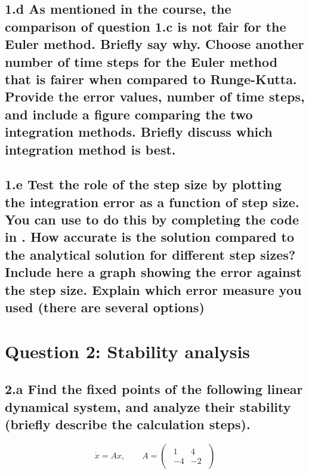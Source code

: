 \documentclass{cmc}
\begin{document}
\vspace{0.3\textheight}



\clearpage

\subsection*{1.d As mentioned in the course, the comparison of question 1.c is
  not fair for the Euler method.  Briefly say why. Choose another number of time
  steps for the Euler method that is fairer when compared to
  Runge-Kutta. Provide the error values, number of time steps, and include a
  figure comparing the two integration methods. Briefly discuss which
  integration method is best.}



\vspace{0.3\textheight}



\clearpage

\subsection*{1.e Test the role of the step size by plotting the integration
  error as a function of step size. You can use
  to do this by completing the code in
  . %
  How accurate is the solution compared to the analytical solution for different
  step sizes?  Include here a graph showing the error against the step
  size. Explain which error measure you used (there are several options)}



\vspace{0.3\textheight}



\clearpage

\section*{Question 2: Stability analysis}

\subsection*{2.a Find the fixed points of the following linear dynamical system,
  and analyze their stability (briefly describe the calculation steps).}

\begin{equation}
  \label{eq:system}
  \dot{x} = A x,
  \qquad
  A =
  \begin{pmatrix}
    \begin{array}{rr}
      1 & 4 \\
      -4 & -2
    \end{array}
  \end{pmatrix}
\end{equation}
\end{document}
